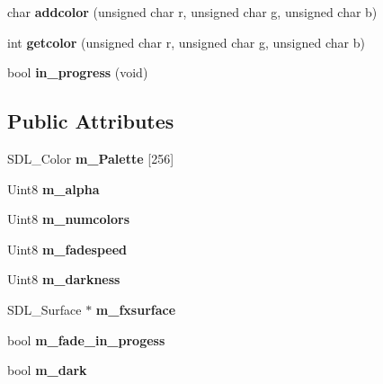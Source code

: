 \begin{DoxyCompactItemize}
\item 
\hypertarget{class_c_palette_a66da092ee92f36e72a01c56ef7a91243}{
char {\bfseries addcolor} (unsigned char r, unsigned char g, unsigned char b)}
\label{class_c_palette_a66da092ee92f36e72a01c56ef7a91243}

\item 
\hypertarget{class_c_palette_a3cc05dfe6dad87b7faa50ef8dccfb0fa}{
int {\bfseries getcolor} (unsigned char r, unsigned char g, unsigned char b)}
\label{class_c_palette_a3cc05dfe6dad87b7faa50ef8dccfb0fa}

\item 
\hypertarget{class_c_palette_a1c7628de24124f5641e53d3b0aa63e31}{
bool {\bfseries in\_\-progress} (void)}
\label{class_c_palette_a1c7628de24124f5641e53d3b0aa63e31}

\end{DoxyCompactItemize}
\subsection*{Public Attributes}
\begin{DoxyCompactItemize}
\item 
\hypertarget{class_c_palette_a20d9361c4a6174b06a5a3d97ed5b6196}{
SDL\_\-Color {\bfseries m\_\-Palette} \mbox{[}256\mbox{]}}
\label{class_c_palette_a20d9361c4a6174b06a5a3d97ed5b6196}

\item 
\hypertarget{class_c_palette_a2d5a98bfed4b671501b4dde2f52798d6}{
Uint8 {\bfseries m\_\-alpha}}
\label{class_c_palette_a2d5a98bfed4b671501b4dde2f52798d6}

\item 
\hypertarget{class_c_palette_acbae0caa161a97255fa5f8ec77bb3e21}{
Uint8 {\bfseries m\_\-numcolors}}
\label{class_c_palette_acbae0caa161a97255fa5f8ec77bb3e21}

\item 
\hypertarget{class_c_palette_a5b3f13cb969ec5b05ffca28ae3b43a0b}{
Uint8 {\bfseries m\_\-fadespeed}}
\label{class_c_palette_a5b3f13cb969ec5b05ffca28ae3b43a0b}

\item 
\hypertarget{class_c_palette_abdeffeb65d69aabaa6da7dd3a430d699}{
Uint8 {\bfseries m\_\-darkness}}
\label{class_c_palette_abdeffeb65d69aabaa6da7dd3a430d699}

\item 
\hypertarget{class_c_palette_ab79904dc3554e0884b1d32b1a124e2b2}{
SDL\_\-Surface $\ast$ {\bfseries m\_\-fxsurface}}
\label{class_c_palette_ab79904dc3554e0884b1d32b1a124e2b2}

\item 
\hypertarget{class_c_palette_a576b055b248db90c7e57a7ecc443adb2}{
bool {\bfseries m\_\-fade\_\-in\_\-progess}}
\label{class_c_palette_a576b055b248db90c7e57a7ecc443adb2}

\item 
\hypertarget{class_c_palette_a5ed8a91d045c934e40fadc9f4af0fd3e}{
bool {\bfseries m\_\-dark}}
\label{class_c_palette_a5ed8a91d045c934e40fadc9f4af0fd3e}

\end{DoxyCompactItemize}


